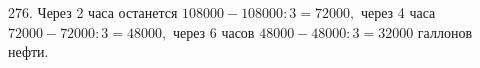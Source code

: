 276. Через 2 часа останется $108000-108000:3=72000,$ через 4 часа $72000-72000:3=48000,$ через 6 часов $48000-48000:3=32000$ галлонов нефти.\\
